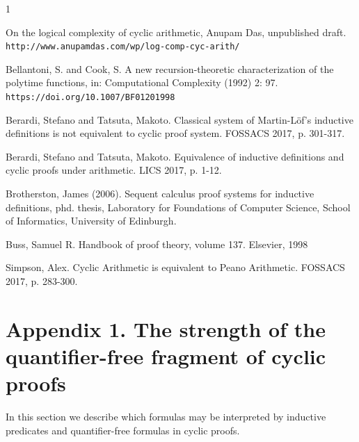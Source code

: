 \documentclass[a4paper,12pt]{article}
\begin{document}
\begin{thebibliography}{1}

On the logical complexity of cyclic arithmetic, Anupam Das, unpublished draft. {\tt http://www.anupamdas.com/wp/log-comp-cyc-arith/  }

Bellantoni, S. and Cook, S. 
A new recursion-theoretic characterization 
of the polytime functions,
in: Computational Complexity (1992) 2: 97. 
{\tt https://doi.org/10.1007/BF01201998}

 Berardi, Stefano and Tatsuta, Makoto. Classical system of Martin-Löf's inductive definitions is not equivalent to cyclic proof system. FOSSACS 2017,  p. 301-317.

 Berardi, Stefano and Tatsuta, Makoto. Equivalence of inductive definitions and cyclic proofs under arithmetic. LICS 2017,  p. 1-12.

 Brotherston, James (2006). Sequent calculus proof systems for inductive definitions, phd. thesis, Laboratory for Foundations of Computer Science, School of Informatics, University of Edinburgh.

Buss, Samuel R. Handbook of proof theory, volume 137. Elsevier, 1998

 Simpson, Alex. Cyclic Arithmetic is equivalent to Peano Arithmetic. FOSSACS 2017, p. 283-300.

\end{thebibliography}



\section{Appendix 1. The strength of the quantifier-free fragment of cyclic proofs}
In this section we describe which formulas may be interpreted by inductive predicates and quantifier-free formulas in cyclic proofs. 
\end{document}

